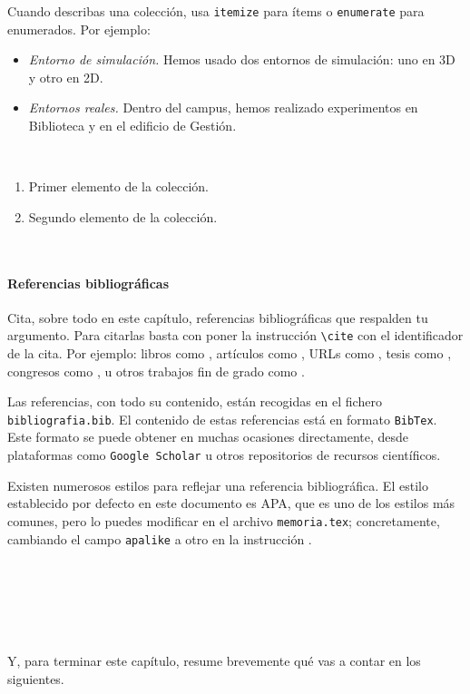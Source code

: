 Cuando describas una colección, usa \texttt{itemize} para ítems o \texttt{enumerate} para enumerados. Por ejemplo:

\begin{itemize}
 \item \textit{Entorno de simulación.} Hemos usado dos entornos de simulación: uno en 3D y otro en 2D.
 \item \textit{Entornos reales.} Dentro del campus, hemos realizado experimentos en Biblioteca y en el edificio de Gestión.
\end{itemize}\

\begin{enumerate}
 \item Primer elemento de la colección.
 \item Segundo elemento de la colección.
\end{enumerate}\

\paragraph{Referencias bibliográficas}
\label{sec:referencias}

Cita, sobre todo en este capítulo, referencias bibliográficas que respalden tu argumento. Para citarlas basta con poner la instrucción \verb|\cite| con el identificador de la cita. Por ejemplo: libros como \cite{vega12e}, artículos como \cite{vega19b}, URLs como \cite{vega19a}, tesis como \cite{vega18b}, congresos como \cite{vega18a}, u otros trabajos fin de grado como \cite{vega08b}.

Las referencias, con todo su contenido, están recogidas en el fichero \texttt{bibliografia.bib}. El contenido de estas referencias está en formato \texttt{BibTex}. Este formato se puede obtener en muchas ocasiones directamente, desde plataformas como \texttt{Google Scholar} u otros repositorios de recursos científicos.

Existen numerosos estilos para reflejar una referencia bibliográfica. El estilo establecido por defecto en este documento es APA, que es uno de los estilos más comunes, pero lo puedes modificar en el archivo \texttt{memoria.tex}; concretamente, cambiando el campo \verb|apalike| a otro en la instrucción \verb||. 

\

\

\

Y, para terminar este capítulo, resume brevemente qué vas a contar en los siguientes.
